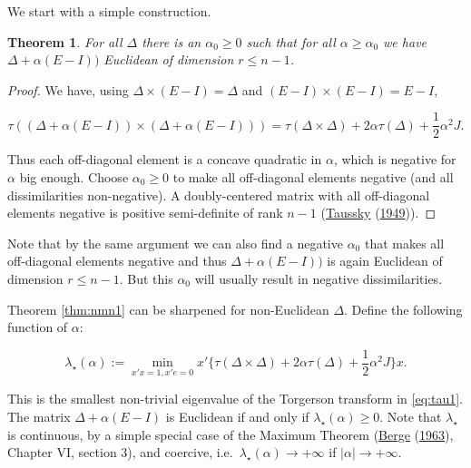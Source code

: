 \documentclass[
  12pt,
]{book}
\newtheorem{theorem}{Theorem}[chapter]
\theoremstyle{definition}
\theoremstyle{definition}
\theoremstyle{definition}
\theoremstyle{definition}
\theoremstyle{remark}
\begin{document}
We start with a simple construction.

\begin{theorem}
\protect\hypertarget{thm:nmn1}{}{\label{thm:nmn1} }For all \(\Delta\) there is an \(\alpha_0\geq 0\) such that for all \(\alpha\geq\alpha_0\) we have \(\Delta+\alpha(E-I))\) Euclidean of dimension \(r\leq n-1\).
\end{theorem}

\begin{proof}
We have, using \(\Delta\times(E-I)=\Delta\) and \((E-I)\times(E-I)=E-I\),

\begin{equation}
  \tau((\Delta+\alpha(E-I))\times(\Delta+\alpha(E-I)))=
  \tau(\Delta\times\Delta)+2\alpha\tau(\Delta)+\frac12\alpha^2J.
\label{eq:tau1}
\end{equation}

Thus each off-diagonal element is a concave quadratic in \(\alpha\), which
is negative for \(\alpha\) big enough. Choose \(\alpha_0\geq 0\) to make all
off-diagonal elements negative (and all dissimilarities non-negative). A doubly-centered matrix with all off-diagonal elements negative is positive semi-definite of rank \(n-1\) (\protect\hyperlink{ref-taussky_49}{Taussky} (\protect\hyperlink{ref-taussky_49}{1949})).
\end{proof}

Note that by the same argument we can also find a negative \(\alpha_0\) that makes all off-diagonal elements negative and thus \(\Delta+\alpha(E-I))\) is again Euclidean of dimension \(r\leq n-1\). But this \(\alpha_0\) will usually result in negative dissimilarities.

Theorem \ref{thm:nmn1} can be sharpened for non-Euclidean \(\Delta\).
Define the following function of \(\alpha\):

\begin{equation}
\lambda_\star(\alpha):=\min_{x'x=1, x'e=0}x'\{\tau(\Delta\times\Delta)+2\alpha\tau(\Delta)+\frac12\alpha^2J\}x.
\label{eq:lambdas}
\end{equation}

This is the smallest non-trivial eigenvalue of the Torgerson transform in
\eqref{eq:tau1}. The matrix \(\Delta+\alpha(E-I)\) is Euclidean if and only if \(\lambda_\star(\alpha)\geq 0\). Note that \(\lambda_\star\) is continuous, by a simple special case of the Maximum Theorem (\protect\hyperlink{ref-berge_63}{Berge} (\protect\hyperlink{ref-berge_63}{1963}), Chapter VI, section 3), and coercive, i.e.~\(\lambda_\star(\alpha)\rightarrow +\infty\) if \(|\alpha|\rightarrow +\infty\).
\end{document}
